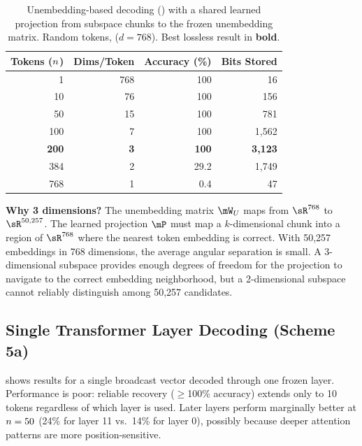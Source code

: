 \begin{table}[t]
    \centering
    \caption{Unembedding-based decoding (\unembdec) with a shared learned projection from subspace chunks to the frozen unembedding matrix. Random tokens, \gptwo ($d = 768$). Best lossless result in \textbf{bold}.}
    \begin{tabular}{@{}rrrr@{}}
        \toprule
        \textbf{Tokens ($n$)} & \textbf{Dims/Token} & \textbf{Accuracy (\%)} & \textbf{Bits Stored} \\
        \midrule
        1 & 768 & 100 & 16 \\
        10 & 76 & 100 & 156 \\
        50 & 15 & 100 & 781 \\
        100 & 7 & 100 & 1,562 \\
        \textbf{200} & \textbf{3} & \textbf{100} & \textbf{3,123} \\
        384 & 2 & 29.2 & 1,749 \\
        768 & 1 & 0.4 & 47 \\
        \bottomrule
    \end{tabular}
    \label{tab:unembed}
\end{table}

{\bf Why 3 dimensions?} The unembedding matrix $\mW_U$ maps from $\sR^{768}$ to $\sR^{50{,}257}$. The learned projection $\mP$ must map a $k$-dimensional chunk into a region of $\sR^{768}$ where the nearest token embedding is correct. With 50,257 embeddings in 768 dimensions, the average angular separation is small. A 3-dimensional subspace provides enough degrees of freedom for the projection to navigate to the correct embedding neighborhood, but a 2-dimensional subspace cannot reliably distinguish among 50,257 candidates.

\subsection{Single Transformer Layer Decoding (Scheme 5a)}
\label{sec:results_layer}

 shows results for a single broadcast vector decoded through one frozen \gptwo layer. Performance is poor: reliable recovery ($\geq$100\% accuracy) extends only to 10 tokens regardless of which layer is used. Later layers perform marginally better at $n = 50$ (24\% for layer 11 vs.\ 14\% for layer 0), possibly because deeper attention patterns are more position-sensitive.

